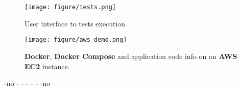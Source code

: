 \documentclass[conference]{IEEEtran}
\begin{document}
\begin{figure}[htb]\label{fig:tests}
\texttt{[image: figure/tests.png]}
\caption{User interface to tests execution}
\end{figure}

\begin{figure}[htb]\label{fig:aws}
\texttt{[image: figure/aws\_demo.png]}
\caption{\textbf{Docker}, \textbf{Docker Compose} and application code info on an \textbf{AWS EC2} instance.}
\end{figure}
\printbibliography

		-no %
		-%
		-%
		-%
		-%
		-%
		-no %


\end{document}
